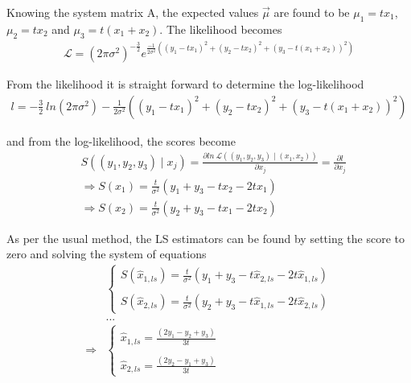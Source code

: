 \documentclass[report,12pt]{report}
\begin{document}
Knowing the system matrix A, the expected values $\vec \mu$ are found to be $\mu_1 = t x_1$, $\mu_2 = t x_2$ and $\mu_3 = t(x_1 + x_2)$. The likelihood becomes
\begin{align}
	\mathcal{L} = 
	(2\pi \sigma^2)^{-\frac{3}{2}}
	e^{\frac{-1}{2 \sigma^2} \left( 
	(y_1 - t x_1)^2 + (y_2 - t x_2)^2 + (y_3 - t(x_1 + x_2))^2 
	\right)}
\end{align}

From the likelihood it is straight forward to determine the log-likelihood
\begin{align}
	l = - \frac{3}{2}\ ln(2\pi \sigma^2)
	-\frac{1}{2 \sigma^2} \left( 
	(y_1 - t x_1)^2 + (y_2 - t x_2)^2 + (y_3 - t(x_1 + x_2))^2 
	\right)
\end{align}

and from the log-likelihood, the scores become
\begin{align}
	&S((y_1, y_2, y_3) \mid x_j) = 
	\frac{\partial ln\ \mathcal{L} 
	\left( (y_1, y_2, y_3) \mid (x_1, x_2) \right)}{\partial x_j}
	= \frac{\partial l}{\partial x_j}
	\nonumber\\
	&\Rightarrow S(x_1) 
	= \frac{t}{\sigma^2}\left( y_1 + y_3 - t x_2 - 2 t x_1 \right)
	\nonumber\\
	&\Rightarrow S(x_2) 
	= \frac{t}{\sigma^2}\left( y_2 + y_3 - t x_1 - 2 t x_2 \right)
\end{align}

As per the usual method, the LS estimators can be found by setting the score to zero and solving the system of equations
\begin{align}
	&\left\{
	\begin{array}{cc} 
	S(\hat x_{1, ls}) = \frac{t}{\sigma^2}
	\left( y_1 + y_3 - t \hat x_{2, ls } - 2 t \hat x_{1, ls} \right)  
	\\
	\\
	S(\hat x_{2, ls }) = \frac{t}{\sigma^2}
	\left( y_2 + y_3 - t \hat x_{1, ls} - 2 t \hat x_{2, ls } \right)  
	\end{array}
	\right.
	\nonumber\\
	&...
	\nonumber\\
	\Rightarrow
	&\left\{
	\begin{array}{cc} 
	\hat x_{1, ls} = \frac{(2 y_1 - y_2 + y_3)}{3t}
	\\
	\\
	\hat x_{2, ls } = \frac{(2 y_2 - y_1 + y_3)}{3t}
	\end{array}
	\right.
	\label{eq:lsestiators}
\end{align}
\end{document}
